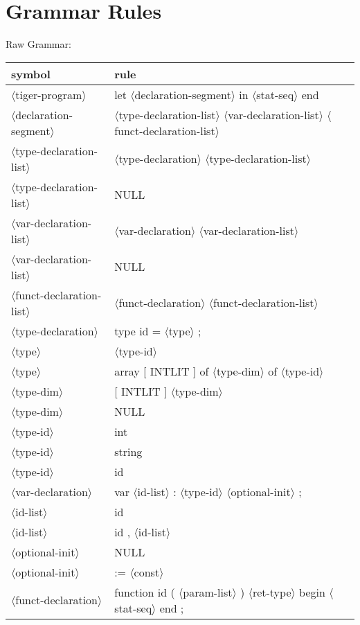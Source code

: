 \documentclass[11pt, fleqn]{article}
\newcommand{\atag}[1]{$\langle$#1$\rangle$}
\begin{document}
\section{Grammar Rules}

Raw Grammar:

\begin{longtable}{l|l}
symbol							&	rule								\\
\hline
\atag{tiger-program}				&	let \atag{declaration-segment} in \atag{stat-seq} end				\\
\atag{declaration-segment}		&	\atag{type-declaration-list}	\atag{var-declaration-list} \atag{funct-declaration-list}	\\
\atag{type-declaration-list}		&	\atag{type-declaration} \atag{type-declaration-list}	\\
\atag{type-declaration-list}		&	NULL		\\
\atag{var-declaration-list}		&	\atag{var-declaration} \atag{var-declaration-list}	\\
\atag{var-declaration-list}		&	NULL		\\
\atag{funct-declaration-list}	&	\atag{funct-declaration} \atag{funct-declaration-list}	\\
\atag{type-declaration}			&	type id = \atag{type} ;		\\
\atag{type}						&	\atag{type-id}		\\
\atag{type}						&	array [ INTLIT ] of \atag{type-dim} of \atag{type-id}	\\
\atag{type-dim}					&	[ INTLIT ] \atag{type-dim}	\\
\atag{type-dim}					&	NULL		\\
\atag{type-id}					&	int		\\
\atag{type-id}					&	string		\\
\atag{type-id}					&	id		\\
\atag{var-declaration}			&	var \atag{id-list} : \atag{type-id} \atag{optional-init} ;		\\
\atag{id-list}					&	id		\\
\atag{id-list}					&	id , \atag{id-list}		\\
\atag{optional-init}				&	NULL		\\
\atag{optional-init}				&	:= \atag{const}		\\
\atag{funct-declaration}			&	function id ( \atag{param-list} ) \atag{ret-type} begin \atag{stat-seq} end ;	\\

\end{longtable}
\end{document}
